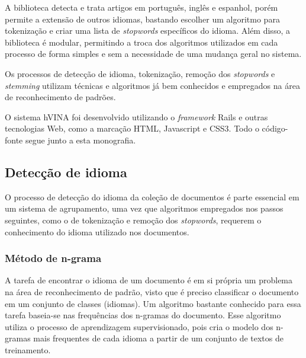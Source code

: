 \documentclass[a4paper,12pt]{article}
\begin{document}
A biblioteca detecta e trata artigos em português, inglês e espanhol, porém permite a extensão de outros idiomas, bastando escolher um algoritmo para tokenização e criar uma lista de \textit{stopwords} específicos do idioma. Além disso, a biblioteca é modular, permitindo a troca dos algoritmos utilizados em cada processo de forma simples e sem a necessidade de uma mudança geral no sistema.

Os processos de detecção de idioma, tokenização, remoção dos \textit{stopwords} e \textit{stemming} utilizam técnicas e algoritmos já bem conhecidos e empregados na área de reconhecimento de padrões. 

O sistema hVINA foi desenvolvido utilizando o \textit{framework} Rails \cite{rails} e outras tecnologias Web, como a marcação HTML, Javascript e CSS3. Todo o código-fonte segue junto a esta monografia.

\subsection {Detecção de idioma}
\label {sec:deteccao_idioma}

O processo de detecção do idioma da coleção de documentos é parte essencial em um sistema de agrupamento, uma vez que algoritmos empregados nos passos seguintes, como o de tokenização e remoção dos \textit{stopwords}, requerem o conhecimento do idioma utilizado nos documentos.

\subsubsection {Método de n-grama}
\label {sec:metodo_ n_grama}

A tarefa de encontrar o idioma de um documento é em si própria um problema na área de reconhecimento de padrão, visto que é preciso classificar o documento em um conjunto de classes (idiomas). Um algoritmo bastante conhecido para essa tarefa baseia-se nas frequências dos n-gramas do documento. Esse algoritmo utiliza o processo de aprendizagem supervisionado, pois cria o modelo dos n-gramas mais frequentes de cada idioma a partir de um conjunto de textos de treinamento.
\end{document}
